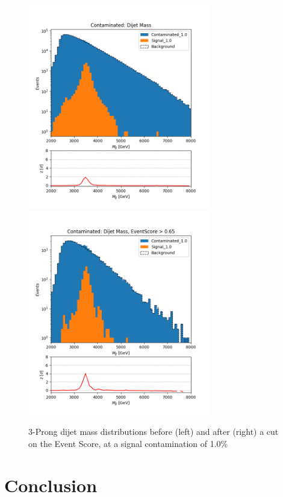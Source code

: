 \documentclass[12pt, a4paper]{article}
\begin{document}
\begin{figure}[H]
	\begin{center}
		\includegraphics[width=225pt]{imgs/3Prong_Contaminated_1p0_JJ_Mass_Multi.png}
		\includegraphics[width=225pt]{imgs/3Prong_Contaminated_1p0_JJ_Mass_EventScore0p65_Multi.png}
	\end{center}
	\caption{3-Prong dijet mass distributions before (left) and after (right) a cut on the Event Score, at a signal contamination of 1.0\%}
	\label{fig:3p_dijet}
\end{figure}




\section*{Conclusion}
\end{document}
